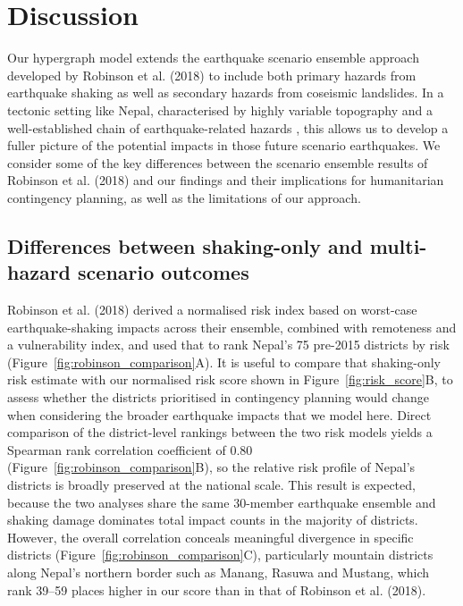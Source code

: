 \documentclass[preprint,12pt,authoryear]{elsarticle}
\begin{document}
\section{Discussion}

Our hypergraph model extends the earthquake scenario ensemble approach developed by Robinson et al. (2018) to include both primary hazards from earthquake shaking as well as secondary hazards from coseismic landslides. In a tectonic setting like Nepal, characterised by highly variable topography and a well-established chain of earthquake-related hazards \citep{Kincey2021}, this allows us to develop a fuller picture of the potential impacts in those future scenario earthquakes. We consider some of the key differences between the scenario ensemble results of Robinson et al. (2018) and our findings and their implications for humanitarian contingency planning, as well as the limitations of our approach.

\subsection{Differences between shaking-only and multi-hazard scenario outcomes}

Robinson et al. (2018) derived a normalised risk index based on worst-case earthquake-shaking impacts across their ensemble, combined with remoteness and a vulnerability index, and used that to rank Nepal's 75 pre-2015 districts by risk (Figure~\ref{fig:robinson_comparison}A). It is useful to compare that shaking-only risk estimate with our normalised risk score shown in Figure~\ref{fig:risk_score}B, to assess whether the districts prioritised in contingency planning would change when considering the broader earthquake impacts that we model here. Direct comparison of the district-level rankings between the two risk models yields a Spearman rank correlation coefficient of 0.80 (Figure~\ref{fig:robinson_comparison}B), so the relative risk profile of Nepal's districts is broadly preserved at the national scale. This result is expected, because the two analyses share the same 30-member earthquake ensemble and shaking damage dominates total impact counts in the majority of districts. However, the overall correlation conceals meaningful divergence in specific districts (Figure~\ref{fig:robinson_comparison}C), particularly mountain districts along Nepal's northern border such as Manang, Rasuwa and Mustang, which rank 39--59 places higher in our score than in that of Robinson et al. (2018). 
\end{document}
